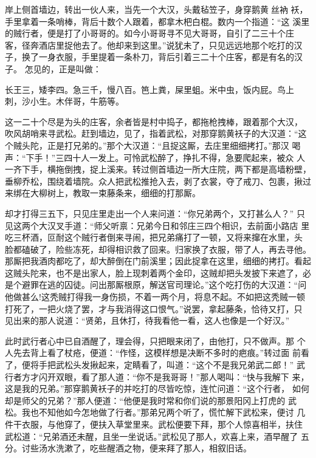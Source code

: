 岸上侧首墙边，转出一伙人来，当先一个大汉，头戴毡笠子，身穿鹅黄丝衲
袄，手里拿着一条哨棒，背后十数个人跟着，都拿木杷白棍。数内一个指道：“这
溪里的贼行者，便是打了小哥哥的。如今小哥哥寻不见大哥哥，自引了二三十个庄
客，径奔酒店里捉他去了。他却来到这里。”说犹未了，只见远远地那个吃打的汉
子，换了一身衣服，手里提着一条朴刀，背后引着三二十个庄客，都是有名的汉子。
怎见的，正是叫做：

长王三，矮李四。急三千，慢八百。笆上粪，屎里蛆。米中虫，饭内屁。鸟上
刺，沙小生。木伴哥，牛筋等。

这一二十个尽是为头的庄客，余者皆是村中捣子，都拖枪拽棒，跟着那个大汉，
吹风胡哨来寻武松。赶到墙边，见了，指着武松，对那穿鹅黄袄子的大汉道：“这
个贼头陀，正是打兄弟的。”那个大汉道：“且捉这厮，去庄里细细拷打。”那汉
喝声：“下手！”三四十人一发上。可怜武松醉了，挣扎不得，急要爬起来，被众
人一齐下手，横拖倒拽，捉上溪来。转过侧首墙边一所大庄院，两下都是高墙粉壁，
垂柳乔松，围绕着墙院。众人把武松推抢入去，剥了衣裳，夺了戒刀、包裹，揪过
来绑在大柳树上，教取一束藤条来，细细的打那厮。

却才打得三五下，只见庄里走出一个人来问道：“你兄弟两个，又打甚么人？”
只见这两个大汉叉手道：“师父听禀：兄弟今日和邻庄三四个相识，去前面小路店
里吃三杯酒，叵耐这个贼行者倒来寻闹，把兄弟痛打了一顿，又将来撺在水里，头
脸都磕破了，险些冻死，却得相识救了回来。归家换了衣服，带了人，再去寻他。
那厮把我酒肉都吃了，却大醉倒在门前溪里；因此捉拿在这里，细细的拷打。看起
这贼头陀来，也不是出家人，脸上现刺着两个金印，这贼却把头发披下来遮了，必
是个避罪在逃的囚徒。问出那厮根原，解送官司理论。”这个吃打伤的大汉道：“问
他做甚么!这秃贼打得我一身伤损，不着一两个月，将息不起。不如把这秃贼一顿
打死了，一把火烧了罢，才与我消得这口恨气。”说罢，拿起藤条，恰待又打，只
见出来的那人说道：“贤弟，且休打，待我看他一看，这人也像是一个好汉。”

此时武行者心中已自酒醒了，理会得，只把眼来闭了，由他打，只不做声。那
个人先去背上看了杖疮，便道：“作怪，这模样想是决断不多时的疤痕。”转过面
前看了，便将手把武松头发揪起来，定睛看了，叫道：“这个不是我兄弟武二郎！”
武行者方才闪开双眼，看了那人道：“你不是我哥哥！”那人喝叫：“快与我解下
来，这是我的兄弟。”那穿鹅黄袄子的并吃打的尽皆吃惊，连忙问道：“这个行者，
如何却是师父的兄弟？”那人便道：“他便是我时常和你们说的那景阳冈上打虎的
武松。我也不知他如今怎地做了行者。”那弟兄两个听了，慌忙解下武松来，便讨
几件干衣服，与他穿了，便扶入草堂里来。武松便要下拜，那个人惊喜相半，扶住
武松道：“兄弟酒还未醒，且坐一坐说话。”武松见了那人，欢喜上来，酒早醒了
五分。讨些汤水洗漱了，吃些醒酒之物，便来拜了那人，相叙旧话。

